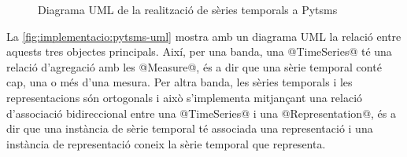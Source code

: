 \begin{figure}
  \centering


  \caption{Diagrama \gls{UML} de la realització de sèries temporals a Pytsms}
  \label{fig:implementacio:pytsms-uml-ts}
\end{figure}





La \autoref{fig:implementacio:pytsms-uml} mostra amb un diagrama
\gls{UML} la relació entre aquests tres objectes principals. Així, per una
banda, una @TimeSeries@ té una relació d'agregació amb les
@Measure@, és a dir que una sèrie temporal conté cap, una o més
d'una mesura.  Per altra banda, les sèries temporals i les
representacions són ortogonals i això s'implementa mitjançant una
relació d'associació bidireccional entre una @TimeSeries@ i una
@Representation@, és a dir que una instància de sèrie temporal té
associada una representació i una instància de representació coneix la
sèrie temporal que representa.




